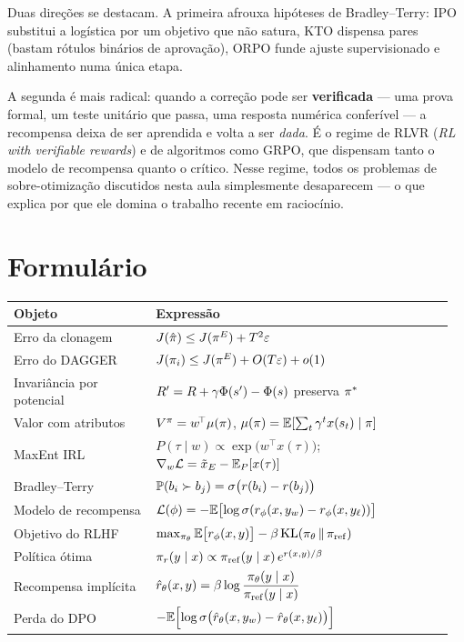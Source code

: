 \documentclass[11pt, a4paper]{article}
\newcommand{\thv}{\theta}
\newcommand{\polth}{\pol_{\thv}}
\newcommand{\polE}{\pol^{E}}
\newcommand{\pref}{\pol_{\mathrm{ref}}}
\newcommand{\rphi}{r_{\phi}}
\newcommand{\traj}{\tau}
\newcommand{\yw}{y_{w}}
\newcommand{\yl}{y_{\ell}}
\newcommand{\KLd}[2]{\mathrm{KL}\!\left(#1 \,\middle\|\, #2\right)}
\newcommand{\sig}{\sigma}
\begin{document}
Duas direções se destacam. A primeira afrouxa hipóteses de Bradley--Terry: IPO
substitui a logística por um objetivo que não satura, KTO dispensa pares
(bastam rótulos binários de aprovação), ORPO funde ajuste supervisionado e
alinhamento numa única etapa.

A segunda é mais radical: quando a correção pode ser \textbf{verificada} --- uma
prova formal, um teste unitário que passa, uma resposta numérica conferível ---
a recompensa deixa de ser aprendida e volta a ser \emph{dada}. É o regime de
RLVR (\emph{RL with verifiable rewards}) e de algoritmos como GRPO, que
dispensam tanto o modelo de recompensa quanto o crítico. Nesse regime, todos os
problemas de sobre-otimização discutidos nesta aula simplesmente desaparecem ---
o que explica por que ele domina o trabalho recente em raciocínio.

\section{Formulário}

\begin{center}\small
\begin{tabular}{@{}p{0.31\linewidth}p{0.65\linewidth}@{}}
\toprule
\textbf{Objeto} & \textbf{Expressão}\\
\midrule
Erro da clonagem & $J(\hat\pol) \le J(\polE) + T^{2}\varepsilon$\\[0.3em]
Erro do DAGGER & $J(\pol_i) \le J(\polE) + O(T\varepsilon) + o(1)$\\[0.3em]
Invariância por potencial & $R' = R + \gamma\Phi(s') - \Phi(s)$ preserva $\pi^{*}$\\[0.3em]
Valor com atributos & $V^{\pi} = w^{\!\top}\mu(\pi)$, \; $\mu(\pi)=\mathbb{E}[\sum_t \gamma^t x(s_t)\mid\pi]$\\[0.3em]
MaxEnt IRL & $P(\traj\mid w) \propto \exp\bigl(w^{\!\top}x(\traj)\bigr)$; \;
  $\nabla_w\mathcal{L} = \tilde x_E - \E_{P}[x(\traj)]$\\[0.3em]
Bradley--Terry & $\Prob(b_i\succ b_j) = \sig\bigl(r(b_i)-r(b_j)\bigr)$\\[0.3em]
Modelo de recompensa & $\mathcal{L}(\phi) = -\E\bigl[\log\sig(\rphi(x,\yw)-\rphi(x,\yl))\bigr]$\\[0.3em]
Objetivo do RLHF & $\max_{\polth}\E\bigl[\rphi(x,y)\bigr] - \beta\,\KLd{\polth}{\pref}$\\[0.3em]
Política ótima & $\pol_r(y\mid x) \propto \pref(y\mid x)\,e^{r(x,y)/\beta}$\\[0.3em]
Recompensa implícita & $\hat r_{\thv}(x,y) = \beta\log\dfrac{\polth(y\mid x)}{\pref(y\mid x)}$\\[0.5em]
Perda do DPO & $-\E\Bigl[\log\sig\bigl(\hat r_{\thv}(x,\yw) - \hat r_{\thv}(x,\yl)\bigr)\Bigr]$\\
\bottomrule
\end{tabular}
\end{center}
\end{document}
